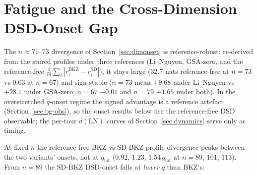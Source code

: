 \documentclass[journal=cic,version=preprint]{iacrj}
\begin{document}
\section{Fatigue and the Cross-Dimension DSD-Onset Gap}
\label{sec:fatigue}

The $n\approx71$--$73$ divergence of
Section~\ref{sec:dimonset} is reference-robust: re-derived from the stored
profiles under three references (Li--Nguyen, GSA-zero, and the reference-free
$\frac1m\sum_i|r_i^{\mathrm{BKZ}}-r_i^{\mathrm{SD}}|$), it stays large
($32.7$ nats reference-free at $n=73$ vs $0.03$ at $n=67$) and sign-stable
($n=73$ mean $+9.68$ under Li--Nguyen vs $+28.1$ under GSA-zero; $n=67$ $-0.01$
and $n=79$ $+1.65$ under both). In
the overstretched $q$-onset regime the signed advantage is a reference artefact
(Section~\ref{sec:bg-obs}), so the onset results below use the reference-free
DSD observable; the per-tour $d(\mathrm{LN})$ curves of
Section~\ref{sec:dynamics} serve only as timing.

At fixed $n$ the reference-free BKZ-vs-SD-BKZ profile divergence peaks
between the two variants' onsets, not at $q_\mathrm{fat}$ ($0.92$, $1.23$,
$1.54\,q_\mathrm{fat}$ at $n=89$, $101$, $113$). From $n=89$ the
SD-BKZ DSD-onset falls at \emph{lower} $q$ than BKZ's:
\end{document}
